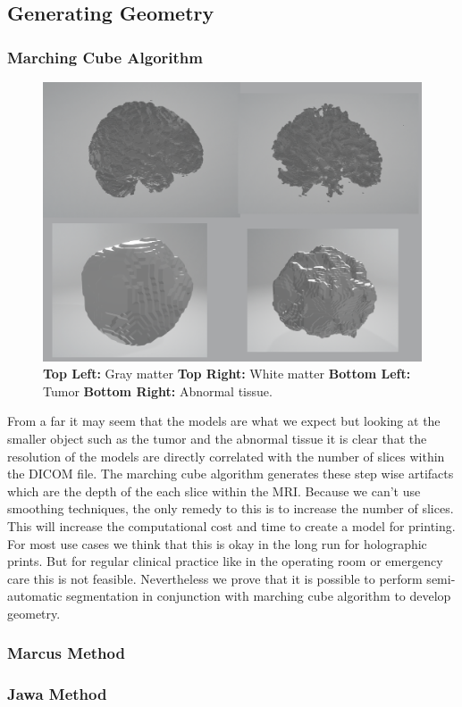 \subsection{Generating Geometry}

\subsubsection{Marching Cube Algorithm}
\begin{figure}[H]
  \centering
  \includegraphics[width=\linewidth]{img/resultsMarchingCube.PNG}
  \caption{\textbf{Top Left:} Gray matter \textbf{Top Right:} White matter \textbf{Bottom Left:} Tumor \textbf{Bottom Right:} Abnormal tissue.}
  \label{fig:resultsMarchingCube}
\end{figure}

From a far it may seem that the models are what we expect but looking at the smaller object such as the tumor and the abnormal tissue it is clear that the resolution of the models are directly correlated with the number of slices within the DICOM file.  The marching cube algorithm generates these step wise artifacts which are the depth of the each slice within the MRI.  Because we can't use smoothing techniques, the only remedy to this is to increase the number of slices.  This will increase the computational cost and time to create a model for printing.  For most use cases we think that this is okay in the long run for holographic prints.  But for regular clinical practice like in the operating room or emergency care this is not feasible.  Nevertheless we prove that it is possible to perform semi-automatic segmentation in conjunction with marching cube algorithm to develop geometry.\\

\subsubsection{Marcus Method}

\subsubsection{Jawa Method}